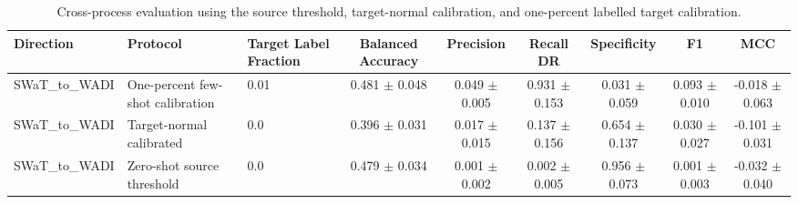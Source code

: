 \begin{table}[t]
\centering
\caption{Cross-process evaluation using the source threshold, target-normal calibration, and one-percent labelled target calibration.}
\label{tab:cross_process_generalisation}
\renewcommand{\arraystretch}{1.12}
\setlength{\tabcolsep}{4pt}
\begin{tabular}{lllcccccc}
\hline
Direction & Protocol & Target Label Fraction & Balanced Accuracy & Precision & Recall DR & Specificity & F1 & MCC \\
\hline
SWaT_to_WADI & One-percent few-shot calibration & 0.01 & 0.481 $\pm$ 0.048 & 0.049 $\pm$ 0.005 & 0.931 $\pm$ 0.153 & 0.031 $\pm$ 0.059 & 0.093 $\pm$ 0.010 & -0.018 $\pm$ 0.063 \\
SWaT_to_WADI & Target-normal calibrated & 0.0 & 0.396 $\pm$ 0.031 & 0.017 $\pm$ 0.015 & 0.137 $\pm$ 0.156 & 0.654 $\pm$ 0.137 & 0.030 $\pm$ 0.027 & -0.101 $\pm$ 0.031 \\
SWaT_to_WADI & Zero-shot source threshold & 0.0 & 0.479 $\pm$ 0.034 & 0.001 $\pm$ 0.002 & 0.002 $\pm$ 0.005 & 0.956 $\pm$ 0.073 & 0.001 $\pm$ 0.003 & -0.032 $\pm$ 0.040 \\
\hline
\end{tabular}
\end{table}